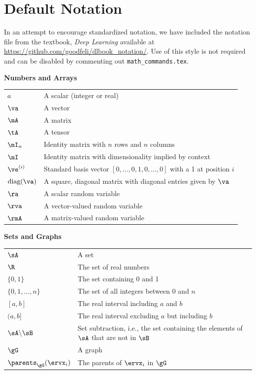 \documentclass{article} %
\begin{document}
\section{Default Notation}

In an attempt to encourage standardized notation, we have included the
notation file from the textbook, \textit{Deep Learning}
\cite{goodfellow2016deep} available at
\url{https://github.com/goodfeli/dlbook_notation/}.  Use of this style
is not required and can be disabled by commenting out
\texttt{math\_commands.tex}.


\centerline{\bf Numbers and Arrays}
\bgroup
\def\arraystretch{1.5}
\begin{tabular}{p{1in}p{3.25in}}
$\displaystyle a$ & A scalar (integer or real)\\
$\displaystyle \va$ & A vector\\
$\displaystyle \mA$ & A matrix\\
$\displaystyle \tA$ & A tensor\\
$\displaystyle \mI_n$ & Identity matrix with $n$ rows and $n$ columns\\
$\displaystyle \mI$ & Identity matrix with dimensionality implied by context\\
$\displaystyle \ve^{(i)}$ & Standard basis vector $[0,\dots,0,1,0,\dots,0]$ with a 1 at position $i$\\
$\displaystyle \text{diag}(\va)$ & A square, diagonal matrix with diagonal entries given by $\va$\\
$\displaystyle \ra$ & A scalar random variable\\
$\displaystyle \rva$ & A vector-valued random variable\\
$\displaystyle \rmA$ & A matrix-valued random variable\\
\end{tabular}
\egroup
\vspace{0.25cm}

\centerline{\bf Sets and Graphs}
\bgroup
\def\arraystretch{1.5}

\begin{tabular}{p{1.25in}p{3.25in}}
$\displaystyle \sA$ & A set\\
$\displaystyle \R$ & The set of real numbers \\
$\displaystyle \{0, 1\}$ & The set containing 0 and 1 \\
$\displaystyle \{0, 1, \dots, n \}$ & The set of all integers between $0$ and $n$\\
$\displaystyle [a, b]$ & The real interval including $a$ and $b$\\
$\displaystyle (a, b]$ & The real interval excluding $a$ but including $b$\\
$\displaystyle \sA \backslash \sB$ & Set subtraction, i.e., the set containing the elements of $\sA$ that are not in $\sB$\\
$\displaystyle \gG$ & A graph\\
$\displaystyle \parents_\gG(\ervx_i)$ & The parents of $\ervx_i$ in $\gG$
\end{tabular}
\vspace{0.25cm}
\end{document}
